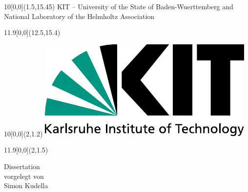 \begin{titlepage}
\begin{center}
\end{center}

\begin{textblock}{10}[0,0](1.5,15.45)
\tiny{ 
KIT -- University of the State of Baden-Wuerttemberg and National Laboratory of the Helmholtz Association
}
\end{textblock}

\begin{textblock}{11.9}[0,0](12.5,15.4)
\large{
}
\end{textblock}

\end{titlepage}

\cleardoublepage

\thispagestyle{empty}

\begin{titlepage}



\begin{textblock}{10}[0,0](2,1.2)
		\includegraphics[width=.3\textwidth]{logos/KITLogo_RGB.pdf}
	\end{textblock}
	
\begin{textblock}{11.9}[0,0](2,1.5)
     \end{textblock}	
	


\begin{center}
\vspace*{32mm}\huge{\textbf{}} \vspace*{25mm}

\LARGE{Dissertation} \\[2ex] 
\normalsize{vorgelegt von} \\[2ex]
\LARGE{Simon Kudella} \\\vspace*{25mm}


\end{center}
\end{titlepage}
